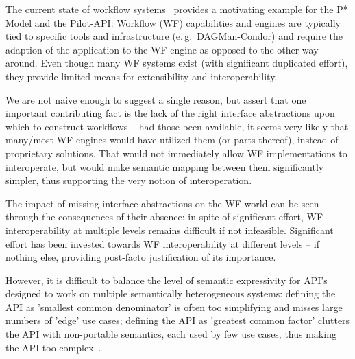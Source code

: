\documentclass[conference,final]{IEEEtran}
\newcommand{\jhanote}[1]{ {\textcolor{red} { ***shantenu: #1 }}}
\newcommand{\alnote}[1]{ {\textcolor{blue} { ***andreL: #1 }}}
\newcommand{\note}[1]{ {\textcolor{magenta} { ***Note: #1 }}}
\newcommand{\alnote}[1]{}
\newcommand{\jhanote}[1]{}
\newcommand{\note}[1]{}
\begin{document}
The current state of workflow systems~\cite{nsf-workflow,1196459}
provides a motivating example for the P* Model and the Pilot-API:
Workflow (WF) capabilities and engines are typically tied to specific
tools and infrastructure (e.\,g.\ DAGMan-Condor) and require the
adaption of the application to the WF engine as opposed to the other
way around. Even though many WF systems exist (with significant
duplicated effort), they provide limited means for extensibility and
interoperability.

We are not naive enough to suggest a single reason, but assert that
one important contributing fact is the lack of the right interface
abstractions upon which to construct workflows -- had those been
available, it seems very likely that many/most WF engines would have
utilized them (or parts thereof), instead of proprietary solutions.
That would not immediately allow WF implementations to interoperate,
but would make semantic mapping between them significantly simpler,
thus supporting the very notion of interoperation.

The impact of missing interface abstractions on the WF world can be
seen through the consequences of their absence: in spite of
significant effort, WF interoperability at multiple levels remains
difficult if not infeasible.  Significant effort has been invested
towards WF interoperability at different levels -- if nothing else,
providing post-facto justification of its importance.



% 


However, it is difficult to balance the level of semantic expressivity
for API's designed to work on multiple semantically heterogeneous
systems: defining the API as 'smallest common denominator' is often
too simplifying and misses large numbers of 'edge' use cases; defining
the API as 'greatest common factor' clutters the API with non-portable
semantics, each used by few use cases, thus making the API too
complex~\cite{leaky_abstractions}. 
\end{document}
